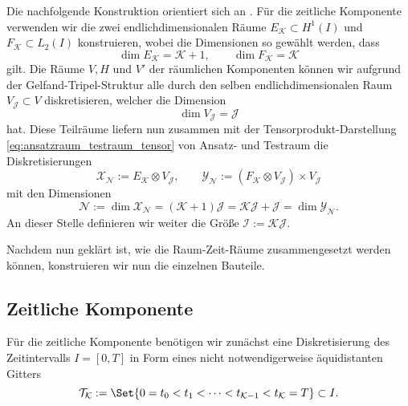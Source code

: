 \documentclass[../main.tex]{subfiles}
\begin{document}
Die nachfolgende Konstruktion orientiert sich an \cite{Andreev:2012uh,Andreev:2012ep}.
Für die zeitliche Komponente verwenden wir die zwei endlichdimensionalen Räume $E_{\mathcal K} \subset H^{1}(I)$ und $F_{\mathcal K} \subset L_{2}(I)$ konstruieren, wobei die Dimensionen so gewählt werden, dass
\begin{equation}
    \label{eq:dimensionen_zeitliche_raeume}
    \dim E_{\mathcal K} = \mathcal K + 1, \qquad \dim F_{\mathcal K} = \mathcal K
\end{equation}
gilt.
Die Räume $V, H$ und $V'$ der räumlichen Komponenten können wir aufgrund der Gelfand-Tripel-Struktur alle durch den selben endlichdimensionalen Raum $V_{\mathcal J} \subset V$ diskretisieren, welcher die Dimension
\begin{equation}
    \label{eq:dimension_raeumliche_raeume}
    \dim V_{\mathcal J} = \mathcal J
\end{equation}
hat.
Diese Teilräume liefern nun zusammen mit der Tensorprodukt-Darstellung \cref{eq:ansatzraum_testraum_tensor} von Ansatz- und Testraum die Diskretisierungen
\begin{equation}
\label{eq:diskrete_tensor_raueme}
    \mathcal X_{\mathcal N} := E_{\mathcal K} \otimes V_{\mathcal J}, \qquad \mathcal Y_{\mathcal N} := (F_{\mathcal K} \otimes V_{\mathcal J}) \times V_{\mathcal J}
\end{equation}
mit den Dimensionen
\begin{equation}
    \mathcal N := \dim \mathcal X_{\mathcal N} = (\mathcal K + 1) \mathcal J = \mathcal K \mathcal J + \mathcal J = \dim \mathcal Y_{\mathcal N}.
\end{equation}
An dieser Stelle definieren wir weiter die Größe $\mathcal I := \mathcal K \mathcal J$.

Nachdem nun geklärt ist, wie die Raum-Zeit-Räume zusammengesetzt werden können, konstruieren wir nun die einzelnen Bauteile.

\subsection*{Zeitliche Komponente}

Für die zeitliche Komponente benötigen wir zunächst eine Diskretisierung des Zeitintervalls $I = [0, T]$ in Form eines nicht notwendigerweise äquidistanten Gitters
\begin{equation}
\label{eq:zeitgitter}
    \mathcal T_{\mathcal K} := \Set{0 = t_0 < t_1 < \dots < t_{\mathcal K - 1} < t_{\mathcal K} = T} \subset I.
\end{equation}
\end{document}
